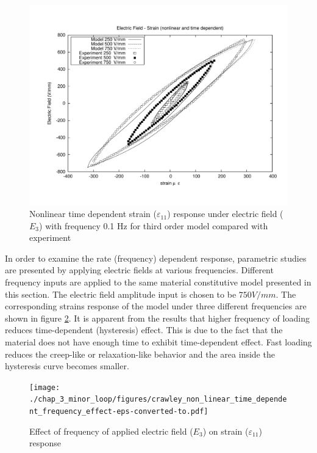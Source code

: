 \begin{figure}
\centering
\includegraphics[width=5.0in]
{./chap_3_minor_loop/figures/crawley_non_linear_time_independent_third_order.pdf}
\caption{Nonlinear time dependent strain ($\varepsilon_{11}$) response under electric field ($E_3$) with frequency 0.1 Hz for third order model compared with experiment \cite{Crawley1990}}
\label{fig:TimeDepenNonLinCrawleyThirdordermodel}
\end{figure}
 
In order to examine the rate (frequency) dependent response, parametric studies are presented by applying electric fields at various frequencies. 
Different frequency inputs are applied to the same material constitutive model presented in this section. The electric field amplitude input is chosen to be $750 V/mm$.
The corresponding strains response of the model under three different frequencies are shown in figure \ref{fig:Frequency_Effect}. 
It is apparent from the results that higher frequency of loading reduces time-dependent (hysteresis) effect. 
This is due to the fact that the material does not have enough time to exhibit time-dependent effect. 
Fast loading reduces the creep-like or relaxation-like behavior and the area inside the hysteresis curve becomes smaller.  

\begin{figure}
\centering
\texttt{[image: ./chap\_3\_minor\_loop/figures/crawley\_non\_linear\_time\_dependent\_frequency\_effect-eps-converted-to.pdf]}
\caption{Effect of frequency of applied electric field ($E_3$) on strain ($\varepsilon_{11}$) response}
\label{fig:Frequency_Effect}
\end{figure}

